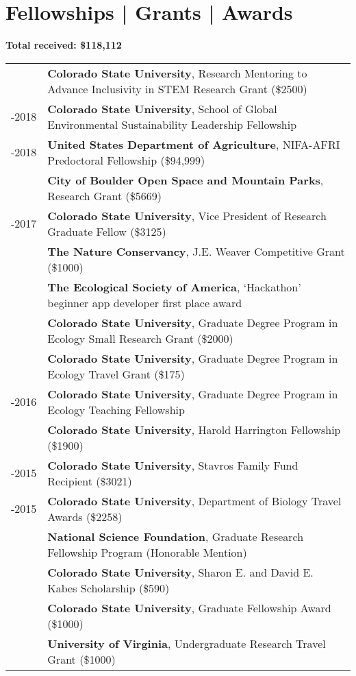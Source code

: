 \documentclass[letterpaper]{deedy-resume} %
\begin{document}
\section{Fellowships | Grants | Awards} 
\raggedright\textbf{Total received: \$118,112}\\
\sectionspace
\begin{tabular}{>{\raggedleft\arraybackslash}p{2cm}p{16cm}}
2018 & \textbf{Colorado State University}, Research Mentoring to Advance Inclusivity in STEM Research Grant (\$2500)\\
2017-2018 & \textbf{Colorado State University}, School of Global Environmental Sustainability Leadership Fellowship\\
2016-2018 & \textbf{United States Department of Agriculture}, NIFA-AFRI Predoctoral Fellowship (\$94,999) \\
2016 & \textbf{City of Boulder Open Space and Mountain Parks}, Research Grant  (\$5669) \\
2016-2017 & \textbf{Colorado State University}, Vice President of Research Graduate Fellow (\$3125) \\
2016 & \textbf{The Nature Conservancy}, J.E. Weaver Competitive Grant (\$1000) \\
2016 & \textbf{The Ecological Society of America}, `Hackathon' beginner app developer first place award\\
2016 & \textbf{Colorado State University}, Graduate Degree Program in Ecology Small Research Grant (\$2000)\\
2016 & \textbf{Colorado State University}, Graduate Degree Program in Ecology Travel Grant (\$175)\\
2015-2016 & \textbf{Colorado State University}, Graduate Degree Program in Ecology Teaching Fellowship\\
2015 & \textbf{Colorado State University}, Harold Harrington Fellowship  (\$1900)\\
2014-2015 & \textbf{Colorado State University}, Stavros Family Fund Recipient  (\$3021) \\
2014-2015 & \textbf{Colorado State University}, Department of Biology Travel Awards (\$2258) \\
2014 & \textbf{National Science Foundation}, Graduate Research Fellowship Program (Honorable Mention)\\
2014	 & \textbf{Colorado State University}, Sharon E. and David E. Kabes Scholarship  (\$590)\\
2013 & \textbf{Colorado State University}, Graduate Fellowship Award (\$1000)\\
2012 & \textbf{University of Virginia}, Undergraduate Research Travel Grant (\$1000)\\
\end{tabular}
\sectionspace
\end{document}
